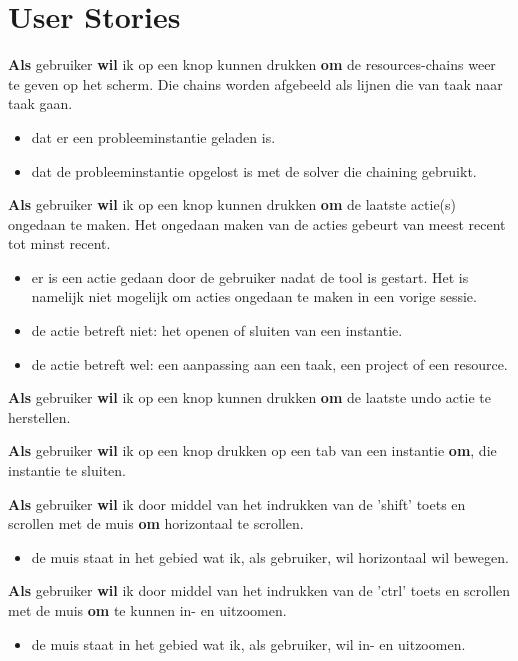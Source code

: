 \section{User Stories}
\setcounter{userstory}{0}
\nextUserStory
\textbf{Als} gebruiker \textbf{wil} ik op een knop kunnen drukken \textbf{om} de resources-chains weer te geven op het scherm. Die chains worden afgebeeld als lijnen die van taak naar taak gaan. 
\begin{itemize} [label=\emph{ - Gegeven}, itemindent=2.5em, labelsep=0.3em]
    \item dat er een probleeminstantie geladen is.
    \item dat de probleeminstantie opgelost is met de solver die chaining gebruikt. 
\end{itemize}

\nextUserStory
\textbf{Als} gebruiker \textbf{wil} ik op een knop kunnen drukken \textbf{om} de laatste actie(s) ongedaan te maken. Het ongedaan maken van de acties gebeurt van meest recent tot minst recent. 
\begin{itemize} [label=\emph{ - Gegeven}, itemindent=2.5em, labelsep=0.3em]
    \item er is een actie gedaan door de gebruiker nadat de tool is gestart. Het is namelijk niet mogelijk om acties ongedaan te maken in een vorige sessie. 
    \item de actie betreft niet: het openen of sluiten van een instantie.
    \item de actie betreft wel: een aanpassing aan een taak, een project of een resource. 
\end{itemize}

\nextUserStory
\textbf{Als} gebruiker \textbf{wil} ik op een knop kunnen drukken \textbf{om} de laatste undo actie te herstellen. 

\nextUserStory
\textbf{Als} gebruiker \textbf{wil} ik op een knop drukken op een tab van een instantie \textbf{om}, die instantie te sluiten. 

\nextUserStory
\textbf{Als} gebruiker \textbf{wil} ik door middel van het indrukken van de 'shift' toets en scrollen met de muis \textbf{om} horizontaal te scrollen. 
\begin{itemize} [label=\emph{ - Gegeven}, itemindent=2.5em, labelsep=0.3em]
    \item de muis staat in het gebied wat ik, als gebruiker, wil horizontaal wil bewegen. 
\end{itemize}

\nextUserStory
\textbf{Als} gebruiker \textbf{wil} ik door middel van het indrukken van de 'ctrl' toets en scrollen met de muis \textbf{om} te kunnen in- en uitzoomen. 
\begin{itemize} [label=\emph{ - Gegeven}, itemindent=2.5em, labelsep=0.3em]
    \item de muis staat in het gebied wat ik, als gebruiker, wil in- en uitzoomen. 
\end{itemize}

